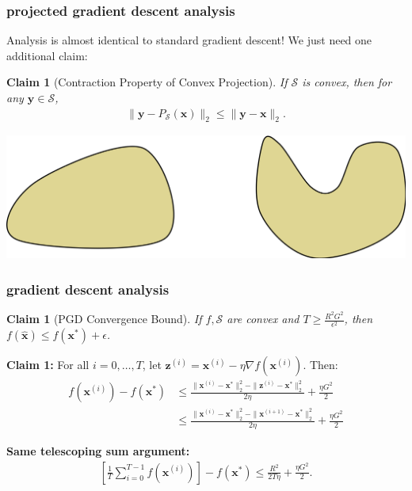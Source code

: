 \documentclass[compress]{beamer}
\newcommand{\bv}[1]{\mathbf{#1}}
\newtheorem{claim}[theorem]{Claim}
\begin{document}
\begin{frame}[t]
	\frametitle{projected gradient descent analysis}
	Analysis is almost identical to standard gradient descent! We just need one additional claim:
	
	\begin{claim}[Contraction Property of Convex Projection]
		If $\mathcal{S}$ is convex, then for \emph{any} $\bv{y} \in \mathcal{S}$,
		\begin{align*}
			\|\bv{y} - P_\mathcal{S}(\bv{x})\|_2 \leq \|\bv{y} - \bv{x}\|_2.
		\end{align*}
	\end{claim}
\vspace{-.75em}
\begin{center}
	\includegraphics[width=\textwidth]{sets.png}
\end{center}	
\end{frame}

\begin{frame}[t]
	\frametitle{gradient descent analysis}
	\small
\begin{claim}[PGD Convergence Bound]
	If $f, \mathcal{S}$ are convex and $T \geq \frac{R^2G^2}{\epsilon^2}$, then $f(\hat{\bv{x}}) \leq f(\bv{x}^*) + \epsilon$.
\end{claim}
	\textbf{Claim 1:} For all $i = 0, \ldots, T$, let $\bv{z}^{(i)} = \bv{x}^{(i)} - \eta \nabla f(\bv{x}^{(i)})$. Then:
	\begin{align*}
		f(\bv{x}^{(i)}) - f(\bv{x}^*) &\leq \frac{\|\bv{x}^{(i)} - \bv{x}^*\|_2^2 - \|\bv{z}^{(i)} - \bv{x}^*\|_2^2}{2\eta} + \frac{\eta G^2}{2}
		\\&\leq \frac{\|\bv{x}^{(i)} - \bv{x}^*\|_2^2 - \|\bv{x}^{(i+1)} - \bv{x}^*\|_2^2}{2\eta} + \frac{\eta G^2}{2}
	\end{align*}
\vspace{4em}

\textbf{Same telescoping sum argument:}\vspace{-.5em}
\begin{align*}
	\left[\frac{1}{T}\sum_{i=0}^{T-1}f(\bv{x}^{(i)})\right] - f(\bv{x}^*) \leq \frac{R^2}{2T\eta} + \frac{\eta G^2}{2}.
\end{align*}
\end{frame}
\end{document}
